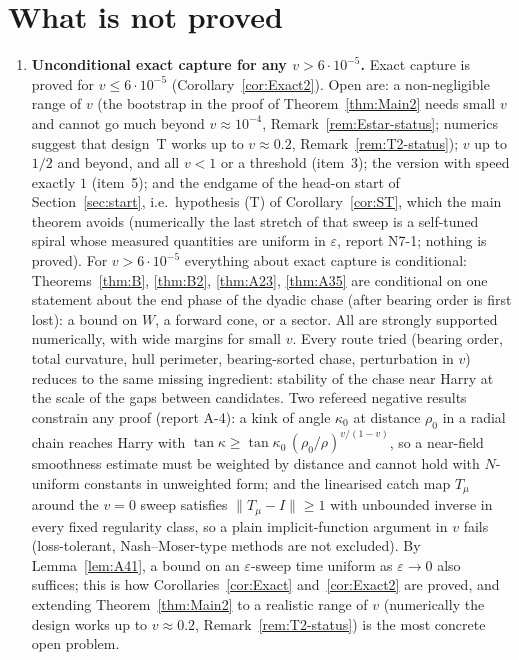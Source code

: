 \documentclass[11pt]{article}
\theoremstyle{remark}\newtheorem{remark}{Remark}
\begin{document}
\section{What is not proved}\label{sec:open}
\begin{enumerate}
\item \textbf{Unconditional exact capture for any $v>6\cdot10^{-5}$.} Exact capture is proved for $v\le6\cdot10^{-5}$
(Corollary~\ref{cor:Exact2}). Open are: a non-negligible range of $v$ (the bootstrap in the proof of Theorem~\ref{thm:Main2} needs
small $v$ and cannot go much beyond $v\approx10^{-4}$, Remark~\ref{rem:Estar-status}; numerics suggest that design~T works up to $v\approx0.2$, Remark~\ref{rem:T2-status}); $v$ up to $1/2$ and beyond, and
all $v<1$ or a threshold (item~3); the version with speed exactly $1$ (item~5); and the endgame of the head-on start of
Section~\ref{sec:start}, i.e.\ hypothesis \textup{(T)} of Corollary~\ref{cor:ST}, which the main theorem avoids (numerically the
last stretch of that sweep is a self-tuned spiral whose measured quantities are uniform in $\varepsilon$, report N7-1; nothing is
proved). For $v>6\cdot10^{-5}$ everything about exact capture is conditional:
Theorems~\ref{thm:B}, \ref{thm:B2}, \ref{thm:A23}, \ref{thm:A35} are
conditional on one statement about the end phase of the dyadic chase (after bearing order is first lost): a bound on $W$, a forward
cone, or a sector. All are strongly supported numerically, with wide margins for small $v$. Every route tried (bearing order, total
curvature, hull perimeter, bearing-sorted chase, perturbation in $v$) reduces to the same missing ingredient: stability of the chase
near Harry at the scale of the gaps between candidates. Two refereed negative results constrain any proof (report A-4): a kink of
angle $\kappa_0$ at distance $\rho_0$ in a radial chain reaches Harry with $\tan\kappa\ge\tan\kappa_0\,(\rho_0/\rho)^{v/(1-v)}$, so a near-field
smoothness estimate must be weighted by distance and cannot hold with $N$-uniform constants in unweighted form; and the
linearised catch map $T_\mu$ around the $v=0$ sweep satisfies $\|T_\mu-I\|\ge1$ with unbounded inverse in every fixed regularity class,
so a plain implicit-function argument in $v$ fails (loss-tolerant, Nash--Moser-type methods are not excluded). By
Lemma~\ref{lem:A41}, a bound on an $\varepsilon$-sweep time uniform as $\varepsilon\to0$ also suffices; this is how
Corollaries~\ref{cor:Exact} and~\ref{cor:Exact2} are proved, and extending Theorem~\ref{thm:Main2} to a realistic range of $v$ (numerically the design
works up to $v\approx0.2$, Remark~\ref{rem:T2-status}) is the most concrete open problem.

\end{enumerate}
\end{document}
